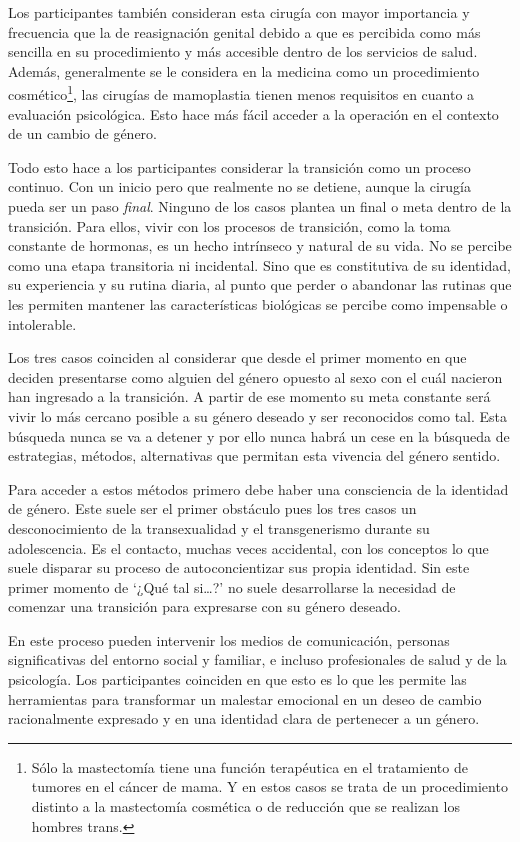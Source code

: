Los participantes también consideran esta cirugía con mayor importancia y
frecuencia que la de reasignación genital debido a que es percibida como más
sencilla en su procedimiento y más accesible dentro de los servicios de salud.
Además, generalmente se le considera en la medicina como un procedimiento
cosmético\footnote{Sólo la mastectomía tiene una función terapéutica en el
tratamiento de tumores en el cáncer de mama. Y en estos casos se trata de un
procedimiento distinto a la mastectomía cosmética o de reducción que se realizan
los hombres trans.}, las cirugías de mamoplastia tienen menos requisitos en
cuanto a evaluación psicológica. Esto hace más fácil acceder a la operación en
el contexto de un cambio de género.

Todo esto hace a los participantes considerar la transición como un proceso
continuo. Con un inicio pero que realmente no se detiene, aunque la cirugía
pueda ser un paso \emph{final}. Ninguno de los casos plantea un final o meta
dentro de la transición. Para ellos, vivir con los procesos de transición, como
la toma constante de hormonas, es un hecho intrínseco y natural de su vida. No
se percibe como una etapa transitoria ni incidental. Sino que es constitutiva de
su identidad, su experiencia y su rutina diaria, al punto que perder o abandonar
las rutinas que les permiten mantener las características biológicas se percibe
como impensable o intolerable.

Los tres casos coinciden al considerar que desde el primer momento en que
deciden presentarse como alguien del género opuesto al sexo con el cuál nacieron
han ingresado a la transición. A partir de ese momento su meta constante será
vivir lo más cercano posible a su género deseado y ser reconocidos como tal.
Esta búsqueda nunca se va a detener y por ello nunca habrá un cese en la
búsqueda de estrategias, métodos, alternativas que permitan esta vivencia del
género sentido.

Para acceder a estos métodos primero debe haber una consciencia de la identidad
de género. Este suele ser el primer obstáculo pues los tres casos un
desconocimiento de la transexualidad y el transgenerismo durante su
adolescencia. Es el contacto, muchas veces accidental, con los conceptos lo que
suele disparar su proceso de autoconcientizar sus propia identidad. Sin este
primer momento de ‘¿Qué tal si…?’ no suele desarrollarse la necesidad de
comenzar una transición para expresarse con su género deseado.

En este proceso pueden intervenir los medios de comunicación, personas
significativas del entorno social y familiar, e incluso profesionales de salud y
de la psicología. Los participantes coinciden en que esto es lo que les permite
las herramientas para transformar un malestar emocional en un deseo de cambio
racionalmente expresado y en una identidad clara de pertenecer a un género.


